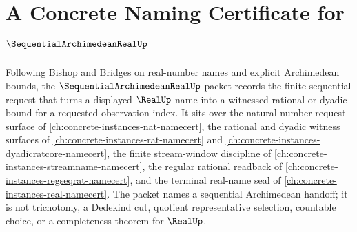 \chapter{A Concrete Naming Certificate for $\SequentialArchimedeanRealUp$}
\label{ch:concrete-instances-sequential-archimedean-real-namecert}

Following Bishop and Bridges on real-number names and explicit Archimedean bounds, the $\SequentialArchimedeanRealUp$ packet records the finite sequential request that turns a displayed $\RealUp$ name into a witnessed rational or dyadic bound for a requested observation index. It sits over the natural-number request surface of \autoref{ch:concrete-instances-nat-namecert}, the rational and dyadic witness surfaces of \autoref{ch:concrete-instances-rat-namecert} and \autoref{ch:concrete-instances-dyadicratcore-namecert}, the finite stream-window discipline of \autoref{ch:concrete-instances-streamname-namecert}, the regular rational readback of \autoref{ch:concrete-instances-regseqrat-namecert}, and the terminal real-name seal of \autoref{ch:concrete-instances-real-namecert}. The packet names a sequential Archimedean handoff; it is not trichotomy, a Dedekind cut, quotient representative selection, countable choice, or a completeness theorem for $\RealUp$.

